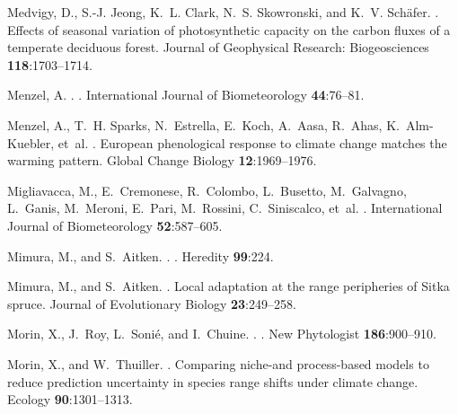 \documentclass{article}
\begin{document}
\begin{thebibliography}{131}
Medvigy, D., S.-J. Jeong, K.~L. Clark, N.~S. Skowronski, and K.~V. Sch{\"a}fer.
.
\newblock Effects of seasonal variation of photosynthetic capacity on the
  carbon fluxes of a temperate deciduous forest.
\newblock Journal of Geophysical Research: Biogeosciences {\bf 118}:1703--1714.

Menzel, A.
.
.
\newblock International Journal of Biometeorology {\bf 44}:76--81.

Menzel, A., T.~H. Sparks, N.~Estrella, E.~Koch, A.~Aasa, R.~Ahas,
  K.~Alm-Kuebler, et~al.
.
\newblock European phenological response to climate change matches the warming
  pattern.
\newblock Global Change Biology {\bf 12}:1969--1976.

Migliavacca, M., E.~Cremonese, R.~Colombo, L.~Busetto, M.~Galvagno, L.~Ganis,
  M.~Meroni, E.~Pari, M.~Rossini, C.~Siniscalco, et~al.
.
\newblock International Journal of Biometeorology {\bf 52}:587--605.

Mimura, M., and S.~Aitken.
.
.
\newblock Heredity {\bf 99}:224.

Mimura, M., and S.~Aitken.
.
\newblock Local adaptation at the range peripheries of {Sitka spruce}.
\newblock Journal of Evolutionary Biology {\bf 23}:249--258.

Morin, X., J.~Roy, L.~Soni{\'e}, and I.~Chuine.
.
.
\newblock New Phytologist {\bf 186}:900--910.

Morin, X., and W.~Thuiller.
.
\newblock Comparing niche-and process-based models to reduce prediction
  uncertainty in species range shifts under climate change.
\newblock Ecology {\bf 90}:1301--1313.


\end{thebibliography}
\end{document}
